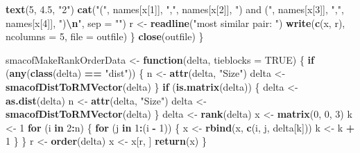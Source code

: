\documentclass[
  12pt,
]{article}
\newenvironment{Shaded}{\begin{snugshade}}{\end{snugshade}}
\newcommand{\AttributeTok}[1]{\textcolor[rgb]{0.13,0.29,0.53}{#1}}
\newcommand{\ConstantTok}[1]{\textcolor[rgb]{0.56,0.35,0.01}{#1}}
\newcommand{\ControlFlowTok}[1]{\textcolor[rgb]{0.13,0.29,0.53}{\textbf{#1}}}
\newcommand{\DecValTok}[1]{\textcolor[rgb]{0.00,0.00,0.81}{#1}}
\newcommand{\FloatTok}[1]{\textcolor[rgb]{0.00,0.00,0.81}{#1}}
\newcommand{\FunctionTok}[1]{\textcolor[rgb]{0.13,0.29,0.53}{\textbf{#1}}}
\newcommand{\NormalTok}[1]{#1}
\newcommand{\OtherTok}[1]{\textcolor[rgb]{0.56,0.35,0.01}{#1}}
\newcommand{\SpecialCharTok}[1]{\textcolor[rgb]{0.81,0.36,0.00}{\textbf{#1}}}
\newcommand{\StringTok}[1]{\textcolor[rgb]{0.31,0.60,0.02}{#1}}
\begin{document}
\begin{Shaded}
\begin{Highlighting}[]
    \FunctionTok{text}\NormalTok{(}\DecValTok{5}\NormalTok{, }\FloatTok{4.5}\NormalTok{, }\StringTok{"2"}\NormalTok{)}
    \FunctionTok{cat}\NormalTok{(}\StringTok{"("}\NormalTok{,}
\NormalTok{        names[x[}\DecValTok{1}\NormalTok{]],}
        \StringTok{","}\NormalTok{,}
\NormalTok{        names[x[}\DecValTok{2}\NormalTok{]],}
        \StringTok{") and ("}\NormalTok{,}
\NormalTok{        names[x[}\DecValTok{3}\NormalTok{]],}
        \StringTok{","}\NormalTok{,}
\NormalTok{        names[x[}\DecValTok{4}\NormalTok{]],}
        \StringTok{")}\SpecialCharTok{\textbackslash{}n}\StringTok{"}\NormalTok{,}
        \AttributeTok{sep =} \StringTok{""}\NormalTok{)}
\NormalTok{    r }\OtherTok{\textless{}{-}} \FunctionTok{readline}\NormalTok{(}\StringTok{"most similar pair: "}\NormalTok{)}
    \FunctionTok{write}\NormalTok{(}\FunctionTok{c}\NormalTok{(x, r), }\AttributeTok{ncolumns =} \DecValTok{5}\NormalTok{, }\AttributeTok{file =}\NormalTok{ outfile)}
\NormalTok{  \}}
  \FunctionTok{close}\NormalTok{(outfile)}
\NormalTok{\}}

\NormalTok{smacofMakeRankOrderData }\OtherTok{\textless{}{-}} \ControlFlowTok{function}\NormalTok{(delta, }\AttributeTok{tieblocks =} \ConstantTok{TRUE}\NormalTok{) \{}
  \ControlFlowTok{if}\NormalTok{ (}\FunctionTok{any}\NormalTok{(}\FunctionTok{class}\NormalTok{(delta) }\SpecialCharTok{==} \StringTok{"dist"}\NormalTok{)) \{}
\NormalTok{    n }\OtherTok{\textless{}{-}} \FunctionTok{attr}\NormalTok{(delta, }\StringTok{"Size"}\NormalTok{)}
\NormalTok{    delta }\OtherTok{\textless{}{-}} \FunctionTok{smacofDistToRMVector}\NormalTok{(delta)}
\NormalTok{  \}}
  \ControlFlowTok{if}\NormalTok{ (}\FunctionTok{is.matrix}\NormalTok{(delta)) \{}
\NormalTok{    delta }\OtherTok{\textless{}{-}} \FunctionTok{as.dist}\NormalTok{(delta)}
\NormalTok{    n }\OtherTok{\textless{}{-}} \FunctionTok{attr}\NormalTok{(delta, }\StringTok{"Size"}\NormalTok{)}
\NormalTok{    delta }\OtherTok{\textless{}{-}} \FunctionTok{smacofDistToRMVector}\NormalTok{(delta)}
\NormalTok{  \}}
\NormalTok{  delta }\OtherTok{\textless{}{-}} \FunctionTok{rank}\NormalTok{(delta)}
\NormalTok{  x }\OtherTok{\textless{}{-}} \FunctionTok{matrix}\NormalTok{(}\DecValTok{0}\NormalTok{, }\DecValTok{0}\NormalTok{, }\DecValTok{3}\NormalTok{)}
\NormalTok{  k }\OtherTok{\textless{}{-}} \DecValTok{1}
  \ControlFlowTok{for}\NormalTok{ (i }\ControlFlowTok{in} \DecValTok{2}\SpecialCharTok{:}\NormalTok{n) \{}
    \ControlFlowTok{for}\NormalTok{ (j }\ControlFlowTok{in} \DecValTok{1}\SpecialCharTok{:}\NormalTok{(i }\SpecialCharTok{{-}} \DecValTok{1}\NormalTok{)) \{}
\NormalTok{      x }\OtherTok{\textless{}{-}} \FunctionTok{rbind}\NormalTok{(x, }\FunctionTok{c}\NormalTok{(i, j, delta[k]))}
\NormalTok{      k }\OtherTok{\textless{}{-}}\NormalTok{ k }\SpecialCharTok{+} \DecValTok{1}
\NormalTok{    \}}
\NormalTok{  \}}
\NormalTok{  r }\OtherTok{\textless{}{-}} \FunctionTok{order}\NormalTok{(delta)}
\NormalTok{  x }\OtherTok{\textless{}{-}}\NormalTok{ x[r, ]}
  \FunctionTok{return}\NormalTok{(x)}
\NormalTok{\}}


\end{Highlighting}
\end{Shaded}
\end{document}
